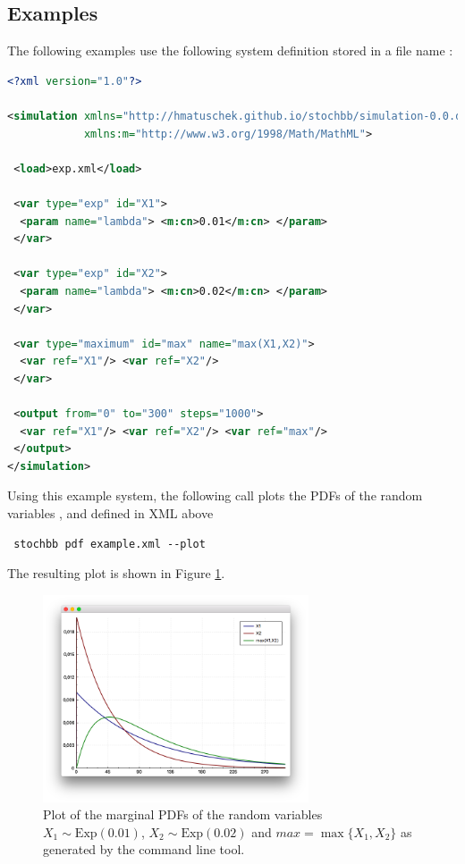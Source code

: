 \documentclass[a4paper, 10pt]{paper}
\begin{document}
\subsection{Examples}
The following examples use the following system definition stored in a file name :
\begin{lstlisting}[language=XML]
<?xml version="1.0"?>

<simulation xmlns="http://hmatuschek.github.io/stochbb/simulation-0.0.dtd"
            xmlns:m="http://www.w3.org/1998/Math/MathML">

 <load>exp.xml</load>

 <var type="exp" id="X1">
  <param name="lambda"> <m:cn>0.01</m:cn> </param>
 </var>

 <var type="exp" id="X2">
  <param name="lambda"> <m:cn>0.02</m:cn> </param>
 </var>

 <var type="maximum" id="max" name="max(X1,X2)">
  <var ref="X1"/> <var ref="X2"/>
 </var>

 <output from="0" to="300" steps="1000">
  <var ref="X1"/> <var ref="X2"/> <var ref="max"/>
 </output>
</simulation>
\end{lstlisting}

Using this example system, the following call plots the PDFs of the random variables ,  and  defined in XML above
\begin{lstlisting}
 stochbb pdf example.xml --plot
\end{lstlisting}
The resulting plot is shown in Figure \ref{fig:exampleplot1}.	

\begin{figure}
 \centering
  \includegraphics[width=0.7\textwidth]{exampleplot1.png}
  \caption{Plot of the marginal PDFs of the random variables $X_1\sim \text{Exp}(0.01)$, $X_2\sim \text{Exp}(0.02)$ and 
	$max = \max\{X_1,X_2\}$ as generated by the  command line tool.} \label{fig:exampleplot1}
\end{figure}
\end{document}
